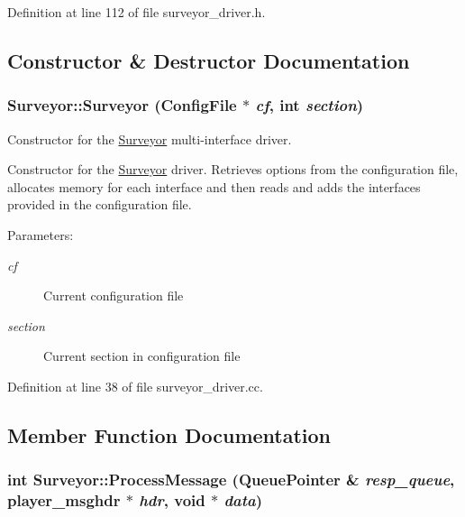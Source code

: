 Definition at line 112 of file surveyor\_\-driver.h.

\subsection{Constructor \& Destructor Documentation}
\hypertarget{classSurveyor_b0792137ec4760d15de63856ebeb7464}{
\subsubsection[{Surveyor}]{\setlength{\rightskip}{0pt plus 5cm}Surveyor::Surveyor (ConfigFile $\ast$ {\em cf}, \/  int {\em section})}}
\label{classSurveyor_b0792137ec4760d15de63856ebeb7464}


Constructor for the \hyperlink{classSurveyor}{Surveyor} multi-interface driver. 

Constructor for the \hyperlink{classSurveyor}{Surveyor} driver. Retrieves options from the configuration file, allocates memory for each interface and then reads and adds the interfaces provided in the configuration file.

\begin{Desc}
\item[Parameters:]
\begin{description}
\item[{\em cf}]Current configuration file \item[{\em section}]Current section in configuration file \end{description}
\end{Desc}


Definition at line 38 of file surveyor\_\-driver.cc.

\subsection{Member Function Documentation}
\hypertarget{classSurveyor_9af107b9b363d15951303c3cbaf4328f}{
\subsubsection[{ProcessMessage}]{\setlength{\rightskip}{0pt plus 5cm}int Surveyor::ProcessMessage (QueuePointer \& {\em resp\_\-queue}, \/  player\_\-msghdr $\ast$ {\em hdr}, \/  void $\ast$ {\em data})}}
\label{classSurveyor_9af107b9b363d15951303c3cbaf4328f}


